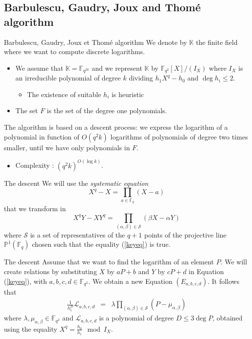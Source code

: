 \documentclass[xcolor=x11names,compress]{beamer}
\theoremstyle{break}
\theoremstyle{sc}
\theoremstyle{definition}
\theoremstyle{remark}
\begin{document}
\subsection{Barbulescu, Gaudry, Joux and Thomé algorithm}

\begin{frame}{Barbulescu, Gaudry, Joux et Thomé algorithm}
  We denote by $\mathbb{K}$ the finite field where we want to compute discrete
  logarithms.
  \begin{itemize}
    \item We assume that $\mathbb{K}=\mathbb{F}_{q^{2k}}$ and we represent
      $\mathbb{K}$ by $\mathbb{F}_{q^2}[X]/(I_X)$ where $I_X$ is an irreducible
      polynomial of degree $k$ dividing $h_1X^q-h_0$ and $\deg h_i\leq 2$.
      \begin{itemize}
        \item The existence of suitable $h_i$ is heuristic
      \end{itemize}
    \item The set $F$ is the set of the degree one polynomials.
\end{itemize}

The algorithm is based on a descent process: we express the logarithm of a
polynomial in function of $O(q^2k)$ logarithms of polynomials of degree two
times smaller, until we have only polynomials in $F$.
    \begin{itemize}
      \item Complexity : $(q^2k)^{O(\log k)}$.
    \end{itemize}

\end{frame}

\begin{frame}{The descent}
  We will use the \emph{systematic equation}
 \[
   X^q - X = \prod_{a\in\mathbb{F}_q}(X-a)
 \]
 that we transform in
 \begin{equation}
   X^qY - XY^q = \prod_{(\alpha, \beta)\in\mathcal S}(\beta X - \alpha Y)
   \label{keyeq}
 \end{equation}
 where $\mathcal S$ is a set of representatives of the $q+1$ points of the
 projective line $\mathbb{P}^1(\mathbb{F}_q)$ chosen such that the equality
 (\ref{keyeq}) is true.
\end{frame}

\begin{frame}{The descent}
  Assume that we want to find the logarithm of an element $P$. We will create
  relations by substituting $X$ by $aP + b$ and $Y$ by $cP + d$ in Equation
  (\ref{keyeq}), with $a, b, c, d \in \mathbb{F}_{q^2}$. We obtain a new
  Equation $(E_{a, b, c, d})$. It follows that
  \begin{eqnarray*}
    \frac{1}{h_1^D}\mathcal L_{a, b, c, d} &=& \lambda \prod_{(\alpha, \beta)\in\mathcal S}(P-\mu_{\alpha, \beta})
  \end{eqnarray*}
  where $\lambda, \mu_{\alpha, \beta}\in\mathbb{F}_{q^2}$ and $\mathcal L_{a, b, c,
  d}$ is a polynomial of degree $D\leq 3\deg P$, obtained using the equality $X^q =
  \frac{h_0}{h_1}\mod I_X$.
  
\end{frame}
\end{document}
